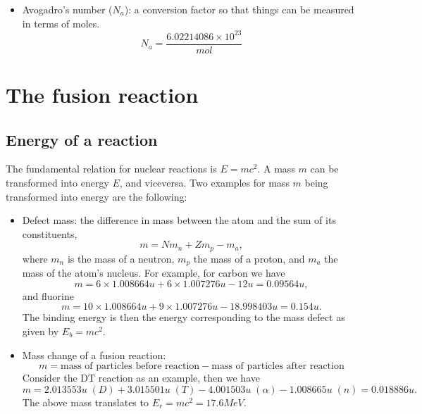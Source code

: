 \documentclass[../hedp.tex]{subfiles}
\begin{document}
\begin{itemize}
\item Avogadro's number ($N_a$): a conversion factor so that things can be measured in terms of moles. 
\begin{equation}
    N_a = \frac{6.02214086 \times 10^{23}}{mol} 
\end{equation}

\end{itemize}
\section{The fusion reaction}
\subsection{Energy of a reaction}
The fundamental relation for nuclear reactions is $E = m c^2$. A mass $m$ can be transformed into energy $E$, and viceversa. Two examples for mass $m$ being transformed into energy are the following:

\begin{itemize}
\item Defect mass: the difference in mass between the atom and the sum of its constituents,
\begin{equation}
m = N m_n + Z m_p - m_a,
\end{equation}
where $m_n$ is the mass of a neutron, $m_p$ the mass of a proton, and $m_a$ the mass of the atom's nucleus. For example, for carbon we have
\begin{equation}
m = 6 \times 1.008664 u + 6 \times 1.007276 u - 12u = 0.09564 u,
\end{equation}
and fluorine
\begin{equation}
m = 10 \times 1.008664 u + 9 \times 1.007276 u - 18.998403u = 0.154 u.
\end{equation}
The binding energy is then the energy corresponding to the mass defect as given by  $E_b = m c^2$.

\item Mass change of a fusion reaction:
\begin{equation}
m = \text{mass of particles before reaction} - \text{mass of particles after reaction} 
\end{equation}
Consider the DT reaction as an example, then we have
\begin{equation}
m = 2.013553u \;(D) + 3.015501u \;(T) - 4.001503u \;(\alpha) - 1.008665u \;(n) = 0.018886u.
\end{equation}
The above mass translates to $E_r = mc^2 = 17.6MeV$.
\end{itemize}
\end{document}

